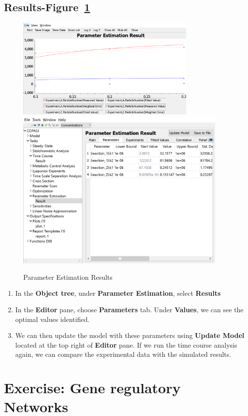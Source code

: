 \documentclass[10pt]{article}
\theoremstyle{definition}
\theoremstyle{remark}
\begin{document}
		\subsection*{Results-Figure~\ref{Result2}}
		\begin{figure}[!htb]
			\centering
			\includegraphics[height=5cm]{Images/R2a.png}
			\includegraphics[height=8cm]{Images/R2b.png}
			\caption{Parameter Estimation Results}
			\label{Result2}
		\end{figure}
		\begin{enumerate}[start=1]\def\makelabel{\textbf{Step}~}
			\item In the \textbf{Object tree}, under \textbf{Parameter Estimation}, select \textbf{Results}
			\item In the \textbf{Editor} pane, choose \textbf{Parameters} tab. Under \textbf{Values}, we can see the optimal values identified. 
			\item We can then update the model with these parameters using \textbf{Update Model} located at the top right of \textbf{Editor} pane. If we run the time course analysis again, we can compare the experimental data with the simulated results.
		\end{enumerate}				
	
	\section{Exercise: Gene regulatory Networks}
\end{document}
